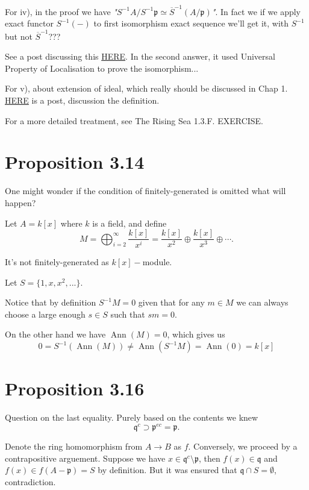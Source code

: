 For iv), in the proof we have \textit{"$S^{-1}A/S^{-1}\mathfrak p\simeq \overline{S}^{-1}(A/\mathfrak p)$"}. In fact we if we apply exact functor $S^{-1}(-)$ to first isomorphism exact sequence we'll get it, with $S^{-1}$ but not $\overline{S}^{-1}$???

See a post discussing this \href{https://math.stackexchange.com/questions/1630232/localization-commutes-with-quotient}{HERE}. In the second answer, it used Universal Property of Localisation to prove the isomorphism...

For v), about extension of ideal, which really should be discussed in Chap 1.
\href{https://math.stackexchange.com/questions/367073/about-the-definition-of-extended-ideals}{HERE} is a post, discussion the definition.

For a more detailed treatment, see The Rising Sea 1.3.F. EXERCISE.

\section{Proposition 3.14}

One might wonder if the condition of finitely-generated is omitted what will happen?

Let $A=k[x]$ where $k$ is a field, and define 
$$M=\bigoplus_{i=2}^{\infty}\frac{k[x]}{x^i}=\frac{k[x]}{x^2}\oplus \frac{k[x]}{x^3}\oplus\cdots.$$

It's not finitely-generated as $k[x]-$module. 

Let $S=\{1,x,x^2,...\}$.

Notice that by definition $S^{-1}M=0$ given that for any $m\in M$ we can always choose a large enough $s\in S$ such that $sm=0$.

On the other hand we have $\operatorname{Ann}(M)=0$, which gives us
$$0=S^{-1}(\operatorname{Ann}(M))\neq \operatorname{Ann}(S^{-1}M)=\operatorname{Ann}(0)=k[x]$$

\section{Proposition 3.16} 

Question on the last equality. Purely based on the contents we knew $$\mathfrak q^c \supset \mathfrak p^{ec}=\mathfrak p.$$

Denote the ring homomorphism from $A\to B$ as $f$.
Conversely, we proceed by a contrapositive arguement. Suppose we have $x\in \mathfrak q^c\setminus \mathfrak p$, then $f(x)\in \mathfrak q$ and $f(x)\in f(A-\mathfrak p)=S$ by definition. But it was ensured that $\mathfrak q\cap S=\emptyset$, contradiction.

